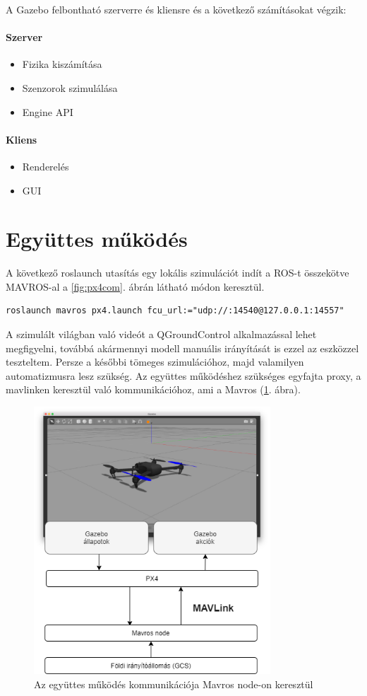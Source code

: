 \noindent
A Gazebo felbontható szerverre és kliensre és a következő számításokat végzik:
\paragraph{Szerver}
\begin{itemize}
	\item Fizika kiszámítása
	\item Szenzorok szimulálása
	\item Engine API
\end{itemize}
\paragraph{Kliens}
\begin{itemize}
	\item Renderelés
	\item GUI
\end{itemize}

\section{Együttes működés}
A következő roslaunch utasítás egy lokális szimulációt indít a ROS-t összekötve MAVROS-al a \ref{fig:px4com}. ábrán látható módon keresztül.
\begin{lstlisting}[caption={Lokális PX4 szimuláció ROS-on keresztül Mavlink-el összekötve}]
roslaunch mavros px4.launch fcu_url:="udp://:14540@127.0.0.1:14557"
\end{lstlisting}
A szimulált világban való videót a QGroundControl alkalmazással lehet megfigyelni, továbbá akármennyi modell manuális irányítását is ezzel az eszközzel teszteltem. Persze a későbbi tömeges szimulációhoz, majd valamilyen automatizmusra lesz szükség. Az együttes működéshez szükséges egyfajta proxy, a mavlinken keresztül való kommunikációhoz, ami a Mavros (\ref{fig:egyuttes}. ábra).

\begin{figure}
	\centering
	\includegraphics[height=10cm]{figures/egyuttes.png}
	\caption{Az együttes működés kommunikációja Mavros node-on keresztül}
	\label{fig:egyuttes}
\end{figure}